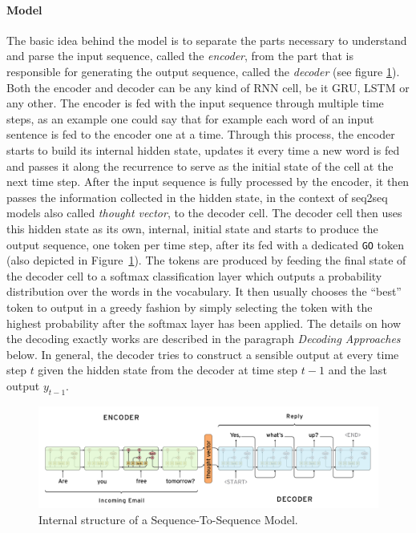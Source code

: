 \paragraph{Model}
The basic idea behind the model is to separate the parts necessary to understand and parse the input sequence, called the \emph{encoder}, from the part that is responsible for generating the output sequence, called the \emph{decoder} (see figure \ref{fundamentals:seq2seq:internal_structure}). Both the encoder and decoder can be any kind of RNN cell, be it GRU, LSTM or any other. The encoder is fed with the input sequence through multiple time steps, as an example one could say that for example each word of an input sentence is fed to the encoder one at a time. Through this process, the encoder starts to build its internal hidden state, updates it every time a new word is fed and passes it along the recurrence to serve as the initial state of the cell at the next time step. After the input sequence is fully processed by the encoder, it then passes the information collected in the hidden state, in the context of seq2seq models also called \emph{thought vector}, to the decoder cell. The decoder cell then uses this hidden state as its own, internal, initial state and starts to produce the output sequence, one token per time step, after its fed with a dedicated \texttt{GO} token (also depicted in Figure~\ref{fundamentals:seq2seq:internal_structure}). The tokens are produced by feeding the final state of the decoder cell to a softmax classification layer which outputs a probability distribution over the words in the vocabulary. It then usually chooses the ``best'' token to output in a greedy fashion by simply selecting the token with the highest probability after the softmax layer has been applied. The details on how the decoding exactly works are described in the paragraph \emph{Decoding Approaches} below. In general, the decoder tries to construct a sensible output at every time step $t$ given the hidden state from the decoder at time step $t-1$ and the last output $y_{t-1}$.

\begin{figure}[h]
	\centering
	\includegraphics[width=14cm]{img/seq2seq_internal}
	\caption{Internal structure of a Sequence-To-Sequence Model.\protect\footnotemark}
	\label{fundamentals:seq2seq:internal_structure}
\end{figure}


